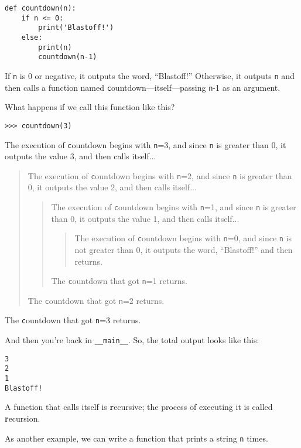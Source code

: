 \documentclass[
DIV=11,
fontsize=12,
twoside,
headinclude=false,
titlepage=firstiscover,
abstract=true,
headsepline=true,
footsepline=true,
chapterprefix=true, %
headings=big,
bibliography=totoc,%
captions=tableheading
]{scrbook}
\theoremstyle{definition}
\begin{document}
\begin{lstlisting}
def countdown(n):
    if n <= 0:
        print('Blastoff!')
    else:
        print(n)
        countdown(n-1)
\end{lstlisting}
%
If {\texttt n} is 0 or negative, it outputs the word, ``Blastoff!''
Otherwise, it outputs {\texttt n} and then calls a function named {\texttt
countdown}---itself---passing {\texttt n-1} as an argument.

What happens if we call this function like this?

\begin{lstlisting}
>>> countdown(3)
\end{lstlisting}
%
The execution of {\texttt countdown} begins with {\texttt n=3}, and since
{\texttt n} is greater than 0, it outputs the value 3, and then calls itself...

\begin{quote}
The execution of {\texttt countdown} begins with {\texttt n=2}, and since
{\texttt n} is greater than 0, it outputs the value 2, and then calls itself...

\begin{quote}
The execution of {\texttt countdown} begins with {\texttt n=1}, and since
{\texttt n} is greater than 0, it outputs the value 1, and then calls itself...

\begin{quote}
The execution of {\texttt countdown} begins with {\texttt n=0}, and since {\texttt
n} is not greater than 0, it outputs the word, ``Blastoff!'' and then
returns.
\end{quote}

The {\texttt countdown} that got {\texttt n=1} returns.
\end{quote}

The {\texttt countdown} that got {\texttt n=2} returns.
\end{quote}

The {\texttt countdown} that got {\texttt n=3} returns.

And then you're back in \verb"__main__".  So, the
total output looks like this:

\begin{lstlisting}
3
2
1
Blastoff!
\end{lstlisting}
%
A function that calls itself is {\textbf recursive}; the process of
executing it is called {\textbf recursion}.

As another example, we can write a function that prints a
string {\texttt n} times.
\end{document}
